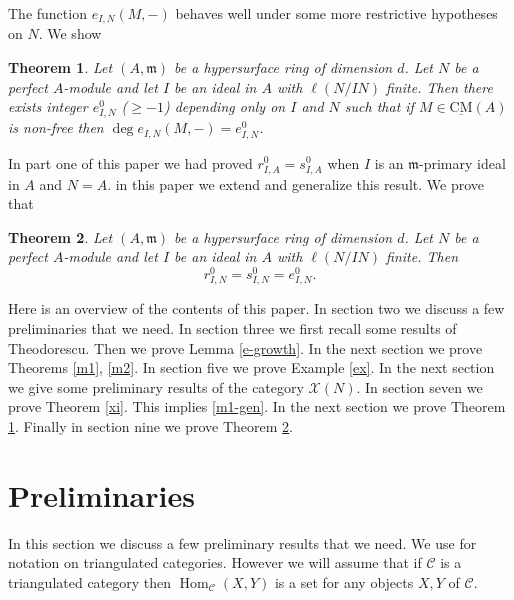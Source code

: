 \documentclass{amsart}
\newcommand{\m}{\mathfrak{m} }
\newcommand{\X}{\mathcal{X} }
\newcommand{\CMS}{\operatorname{\underline{CM}}}
\newcommand{\Hom}{\operatorname{Hom}}
\theoremstyle{plain}
\newtheorem{theorem}{Theorem}[section]
\theoremstyle{definition}
\theoremstyle{remark}
\begin{document}
The function $ e_{I,N}(M, -) $ behaves well under some more restrictive hypotheses on $N$.
We show
\begin{theorem}\label{m2-gen}
Let $(A,\m)$ be a hypersurface ring of dimension $d$. Let $N$ be a perfect $A$-module and let $I$ be an ideal in $A$ with $\ell(N/IN)$ finite. Then
 there exists integer $e_{I, N}^0$  ($\geq -1$) depending only on $I$ and $N$ such that if $M \in \CMS(A)$ is  non-free then
$\deg e_{I,N}(M, -) = e_{I, N}^0$.
\end{theorem}

In part one of this paper we had proved $ r_{I, A}^0 = s_{I, A}^0$ when $I$ is an $\m$-primary ideal in $A$ and $N = A$.
in this paper we extend and generalize this result. We prove that
\begin{theorem}\label{m3-gen}
Let $(A,\m)$ be a hypersurface ring of dimension $d$. Let $N$ be a perfect $A$-module and let $I$ be an ideal in $A$ with $\ell(N/IN)$ finite.  Then
 $$ r_{I, N}^0 = s_{I, N}^0 = e_{I, N}^0. $$
\end{theorem}

Here is an overview of the contents of this paper. In section two we discuss a few preliminaries that we need.
In section three we first recall some results of Theodorescu. Then we prove Lemma \ref{e-growth}. In the next section we prove Theorems \ref{m1}, \ref{m2}. In section five we prove Example \ref{ex}. In the next section we give some preliminary results of the category $\X(N)$. In section seven we prove Theorem \ref{xi}. This implies \ref{m1-gen}. In the next section we prove Theorem \ref{m2-gen}. Finally in section nine we prove Theorem \ref{m3-gen}.
\section{Preliminaries}
In this section we discuss a few preliminary results that we need.
We use \cite{N} for notation on triangulated categories. However we will assume that if $\mathcal{C}$ is a triangulated category then $\Hom_\mathcal{C}(X, Y)$ is a set for any objects $X, Y$ of $\mathcal{C}$.
\end{document}

